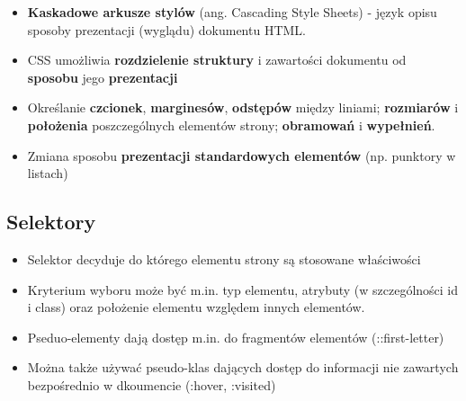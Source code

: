 \documentclass[../main.tex]{subfiles}
\begin{document}
    \begin{itemize}
        \item \textbf{Kaskadowe arkusze stylów} (ang. Cascading Style Sheets) - język opisu sposoby prezentacji (wyglądu) dokumentu HTML.
        \item CSS umożliwia \textbf{rozdzielenie struktury} i zawartości dokumentu od \textbf{sposobu} jego \textbf{prezentacji}\\

        \item Określanie \textbf{czcionek}, \textbf{marginesów}, \textbf{odstępów} między liniami; \textbf{rozmiarów} i \textbf{położenia} poszczególnych elementów
        strony; \textbf{obramowań} i \textbf{wypełnień}.
        \item Zmiana sposobu \textbf{prezentacji standardowych elementów} (np. punktory w listach)
    \end{itemize}

    \subsection{Selektory}
    \begin{itemize}
        \item Selektor decyduje do którego elementu strony są stosowane właściwości
        \item Kryterium wyboru może być m.in. typ elementu, atrybuty (w szczególności id i class) oraz położenie elementu względem innych elementów.
        \item Pseduo-elementy dają dostęp m.in. do fragmentów elementów (::first-letter)
        \item Można także używać pseudo-klas dających dostęp do informacji nie zawartych bezpośrednio w dkoumencie (:hover, :visited)
    \end{itemize}
\end{document}
